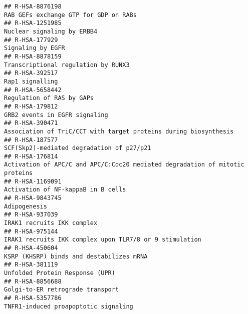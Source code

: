 \documentclass[
]{article}
\begin{document}
\begin{verbatim}
## R-HSA-8876198                                                                                                RAB GEFs exchange GTP for GDP on RABs
## R-HSA-1251985                                                                                                           Nuclear signaling by ERBB4
## R-HSA-177929                                                                                                                     Signaling by EGFR
## R-HSA-8878159                                                                                                  Transcriptional regulation by RUNX3
## R-HSA-392517                                                                                                                       Rap1 signalling
## R-HSA-5658442                                                                                                            Regulation of RAS by GAPs
## R-HSA-179812                                                                                                         GRB2 events in EGFR signaling
## R-HSA-390471                                                                      Association of TriC/CCT with target proteins during biosynthesis
## R-HSA-187577                                                                                             SCF(Skp2)-mediated degradation of p27/p21
## R-HSA-176814                                                          Activation of APC/C and APC/C:Cdc20 mediated degradation of mitotic proteins
## R-HSA-1169091                                                                                                   Activation of NF-kappaB in B cells
## R-HSA-9843745                                                                                                                         Adipogenesis
## R-HSA-937039                                                                                                            IRAK1 recruits IKK complex
## R-HSA-975144                                                                               IRAK1 recruits IKK complex upon TLR7/8 or 9 stimulation
## R-HSA-450604                                                                                              KSRP (KHSRP) binds and destabilizes mRNA
## R-HSA-381119                                                                                                       Unfolded Protein Response (UPR)
## R-HSA-8856688                                                                                                     Golgi-to-ER retrograde transport
## R-HSA-5357786                                                                                                 TNFR1-induced proapoptotic signaling

\end{verbatim}
\end{document}
